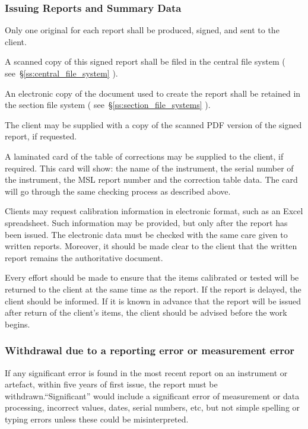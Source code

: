 \subsubsection{Issuing Reports and Summary Data}
Only one original for each report shall be produced, signed, and sent to the client. 

A scanned copy of this signed report shall be filed in the central file system ( see~\S\ref{ss:central_file_system} ). 

An electronic copy of the document used to create the report shall be retained in the section file system ( see~\S\ref{ss:section_file_systems} ). 
   
The client may be supplied with a copy of the scanned PDF version of the signed report, if requested.

A laminated card of the table of corrections may be supplied to the client, if required.  This card will show: the name of the instrument, the serial number of the instrument, the MSL report number and the correction table data.  The card will go through the same checking process as described above.

Clients may request calibration information in electronic format, such as an Excel spreadsheet. Such information may be provided, but only after the report has been issued. The electronic data must be checked with the same care given to written reports. Moreover, it should be made clear to the client that the written report remains the authoritative document. 

Every effort should be made to ensure that the items calibrated or tested will be returned to the client at the same time as the report. If the report is delayed, the client should be informed. If it is known in advance that the report will be issued after return of the client’s items, the client should be advised before the work begins.

\subsubsection{Withdrawal due to a reporting error or measurement error}
\label{sss:reissue_report}
If any significant error is found in the most recent report on an instrument or artefact, within five years of first issue, the report must be withdrawn.``Significant” would include a significant error of measurement or data processing, incorrect values, dates, serial numbers, etc, but not simple spelling or typing errors unless these could be misinterpreted.

